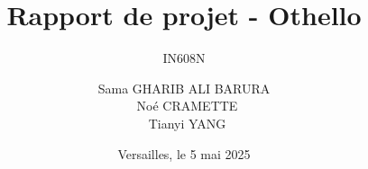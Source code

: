 \documentclass[aspectratio=169]{beamer}
\title{Rapport de projet - Othello}
\subtitle{IN608N}
\author{Sama GHARIB ALI BARURA \\
\ Noé CRAMETTE \\
\ Tianyi YANG}
\institute
{
    Université de Versailles Saint-Quentin \\
    Licence d'informatique %
}
\date{Versailles, le 5 mai 2025} %
\begin{document}
	\begin{frame}
		\titlepage
	\end{frame}

	
	
	
\end{document}
